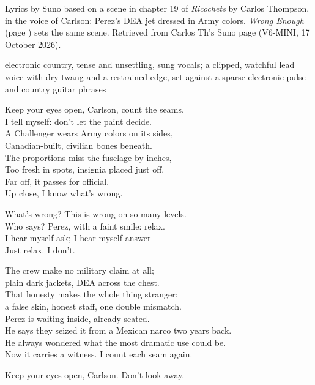
\label{sec:keep-your-eyes-open}
\begin{notes}
Lyrics by Suno based on a scene in chapter 19 of \emph{Ricochets} by Carlos Thompson, in the voice of Carlson: Perez's DEA jet dressed in Army colors. \emph{Wrong Enough} (page \pageref{sec:wrong-enough}) sets the same scene. Retrieved from Carlos Th's Suno page (V6-MINI, 17 October 2026).
\end{notes}
\begin{style}
electronic country, tense and unsettling, sung vocals; a clipped, watchful lead voice with dry twang and a restrained edge, set against a sparse electronic pulse and country guitar phrases
\end{style}
\begin{lyrics}
Keep your eyes open, Carlson, count the seams.\\
I tell myself: don’t let the paint decide.\\
A Challenger wears Army colors on its sides,\\
Canadian-built, civilian bones beneath.\\
The proportions miss the fuselage by inches,\\
Too fresh in spots, insignia placed just off.\\
Far off, it passes for official.\\
Up close, I know what’s wrong.

What’s wrong? This is wrong on so many levels.\\
Who says? Perez, with a faint smile: relax.\\
I hear myself ask; I hear myself answer—\\
Just relax. I don’t.

The crew make no military claim at all;\\
plain dark jackets, DEA across the chest.\\
That honesty makes the whole thing stranger:\\
a false skin, honest staff, one double mismatch.\\
Perez is waiting inside, already seated.\\
He says they seized it from a Mexican narco two years back.\\
He always wondered what the most dramatic use could be.\\
Now it carries a witness. I count each seam again.

Keep your eyes open, Carlson. Don’t look away.
\end{lyrics}

